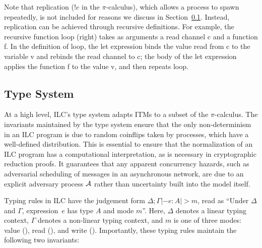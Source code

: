 \begingroup
\setlength\intextsep{0pt}
\begin{wrapfigure}{r}{0.35\textwidth}
  
\end{wrapfigure}
Note that replication ($!e$ in the $\pi$-calculus), which allows a process to
spawn repeatedly, is not included for reasons we discuss in
Section~\ref{subsec:types}. Instead, replication can be achieved through
recursive definitions. For example, the recursive function \textsf{loop} (right)
takes as arguments a read channel \textsf{c} and a function \textsf{f}. In the
definition of \textsf{loop}, the let expression binds the value read from
\textsf{c} to the variable \textsf{v} and rebinds the read channel to
\textsf{c}; the body of the let expression applies the function \textsf{f} to
the value \textsf{v}, and then repeats \textsf{loop}.\mypar
\endgroup



\subsection{Type System}
\label{subsec:types}







At a high level, ILC's type system adapts ITMs to a subset of the $\pi$-calculus.
The invariants maintained by the type system ensure that the only
non-determinism in an ILC program is due to random coinflips taken by processes,
which have a well-defined distribution. This is essential to ensure that the
normalization of an ILC program has a computational interpretation, as is
necessary in cryptographic reduction proofs. It guarantees that any apparent
concurrency hazards, such as adversarial scheduling of messages in an
asynchronous network, are due to an explicit adversary process $\mathcal{{A}}$ rather
than uncertainty built into the model itself.

Typing rules in ILC have the judgement form $\Delta ; \Gamma |- e : A |> m$, read as
``Under $\Delta$ and $\Gamma$, expression~$e$ has type $A$ and mode $m$''.  Here, $\Delta$
denotes a linear typing context, $\Gamma$ denotes a non-linear typing context, and
$m$ is one of three modes: value (\Vm), read (\Rm), and write
(\Wm). Importantly, these typing rules maintain the following two invariants:

